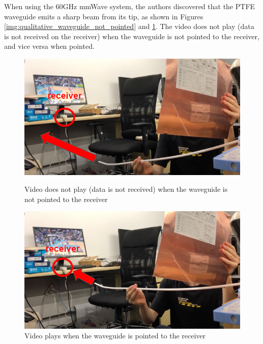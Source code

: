 \documentclass[a4paper,12pt]{report}
\begin{document}
When using the 60GHz mmWave system,
the authors discovered that the PTFE waveguide
emits a sharp beam from its tip,
as shown in Figures \ref{img:qualitative_waveguide_not_pointed}
and \ref{img:qualitative_waveguide_pointed}.
The video does not play (data is not received on the receiver)
when the waveguide is not pointed to the receiver,
and vice versa when pointed.

\begin{figure}
  \centering
  \begin{minipage}{0.45\textwidth}
    \centering
    \includegraphics[clip, keepaspectratio, width=0.9\linewidth]{img/qualitative_waveguide_not_pointed.png}
    \caption{Video does not play (data is not received) when the waveguide is not pointed to the receiver}
    \label{img:qualitative_waveguide_not_pointed}
  \end{minipage}\hfill
  \begin{minipage}{0.45\textwidth}
    \centering
    \includegraphics[clip, keepaspectratio, width=0.9\linewidth]{img/qualitative_waveguide_pointed.png}
    \caption{Video plays when the waveguide is pointed to the receiver}
    \label{img:qualitative_waveguide_pointed}
  \end{minipage}\hfill
\end{figure}
\end{document}
